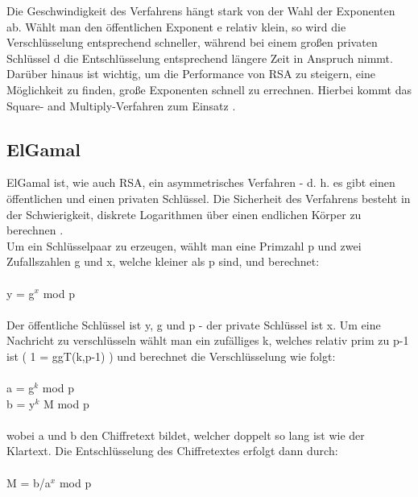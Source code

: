 \documentclass[10pt, a4paper,headsepline]{scrreprt}
\begin{document}
Die Geschwindigkeit des Verfahrens hängt stark von der Wahl der Exponenten ab. Wählt man den öffentlichen Exponent e relativ klein, so wird die Verschlüsselung entsprechend schneller, während bei einem großen privaten Schlüssel d die Entschlüsselung entsprechend längere Zeit in Anspruch nimmt. Darüber hinaus ist wichtig, um die Performance von RSA zu steigern, eine Möglichkeit zu finden, große Exponenten schnell zu errechnen. Hierbei kommt das Square- and Multiply-Verfahren zum Einsatz \citep[S. 173ff]{book:understanding-crypto}.

\subsection{ElGamal}
ElGamal ist, wie auch RSA, ein asymmetrisches Verfahren - d. h. es gibt einen öffentlichen und einen privaten Schlüssel. Die Sicherheit des Verfahrens besteht in der Schwierigkeit, diskrete Logarithmen über einen endlichen Körper zu berechnen \citep[S. 543ff]{book:angewandte-krypto}. \\
Um ein Schlüsselpaar zu erzeugen, wählt man eine Primzahl p und zwei Zufallszahlen g und x, welche kleiner als p sind, und berechnet: \\ \\
y = g$^{x}$ mod p \\ \\
Der öffentliche Schlüssel ist y, g und p - der private Schlüssel ist x. Um eine Nachricht zu verschlüsseln wählt man ein zufälliges k, welches relativ prim zu p-1 ist ( 1 = ggT(k,p-1) ) und berechnet die Verschlüsselung wie folgt: \\ \\
a = g$^{k}$ mod p \\
b = y$^{k}$ M mod p \\ \\
wobei a und b den Chiffretext bildet, welcher doppelt so lang ist wie der Klartext. Die Entschlüsselung des Chiffretextes erfolgt dann durch: \\ \\
M = b/a$^{x}$ mod p \\
\end{document}
